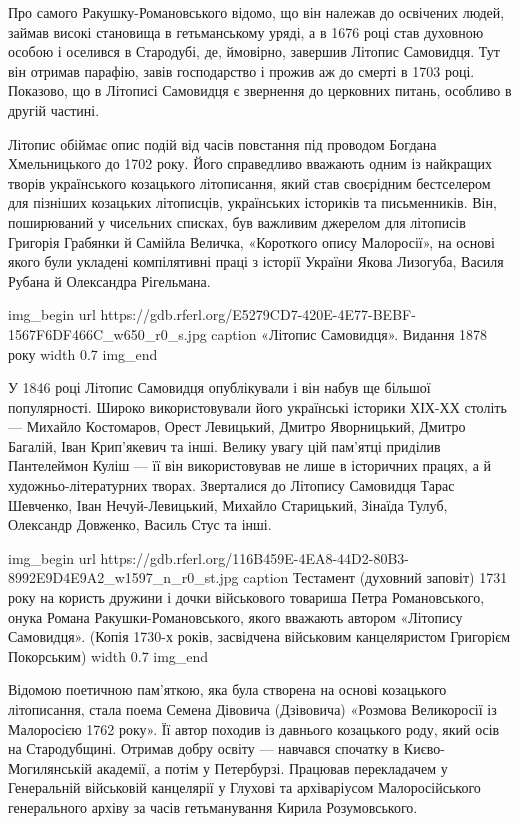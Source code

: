 Про самого Ракушку-Романовського відомо, що він належав до освічених людей,
займав високі становища в гетьманському уряді, а в 1676 році став духовною
особою і оселився в Стародубі, де, ймовірно, завершив Літопис Самовидця. Тут
він отримав парафію, завів господарство і прожив аж до смерті в 1703 році.
Показово, що в Літописі Самовидця є звернення до церковних питань, особливо в
другій частині.

Літопис обіймає опис подій від часів повстання під проводом Богдана
Хмельницького до 1702 року. Його справедливо вважають одним із найкращих творів
українського козацького літописання, який став своєрідним бестселером для
пізніших козацьких літописців, українських істориків та письменників. Він,
поширюваний у чисельних списках, був важливим джерелом для літописів Григорія
Грабянки й Самійла Величка, «Короткого опису Малоросії», на основі якого були
укладені компілятивні праці з історії України Якова Лизогуба, Василя Рубана й
Олександра Рігельмана.

\ifcmt
img_begin 
  url https://gdb.rferl.org/E5279CD7-420E-4E77-BEBF-1567F6DF466C_w650_r0_s.jpg
  caption «Літопис Самовидця». Видання 1878 року
  width 0.7
img_end
\fi

У 1846 році Літопис Самовидця опублікували і він набув ще більшої популярності.
Широко використовували його українські історики ХІХ-ХХ століть --- Михайло
Костомаров, Орест Левицький, Дмитро Яворницький, Дмитро Багалій, Іван
Крип’якевич та інші. Велику увагу цій пам’ятці приділив Пантелеймон Куліш --- її
він використовував не лише в історичних працях, а й художньо-літературних
творах. Зверталися до Літопису Самовидця Тарас Шевченко, Іван Нечуй-Левицький,
Михайло Старицький, Зінаїда Тулуб, Олександр Довженко, Василь Стус та інші.

\ifcmt
img_begin 
        url https://gdb.rferl.org/116B459E-4EA8-44D2-80B3-8992E9D4E9A2_w1597_n_r0_st.jpg
        caption Тестамент (духовний заповіт) 1731 року на користь дружини і
        дочки військового товариша Петра Романовського, онука Романа
        Ракушки-Романовського, якого вважають автором «Літопису Самовидця».
        (Копія 1730-х років, засвідчена військовим канцеляристом Григорієм
        Покорським)
        width 0.7
img_end
\fi

Відомою поетичною пам’яткою, яка була створена на основі козацького
літописання, стала поема Семена Дівовича (Дзівовича) «Розмова Великоросії із
Малоросією 1762 року». Її автор походив із давнього козацького роду, який осів
на Стародубщині. Отримав добру освіту --- навчався спочатку в Києво-Могилянській
академії, а потім у Петербурзі. Працював перекладачем у Генеральній військовій
канцелярії у Глухові та архіваріусом Малоросійського генерального архіву за
часів гетьманування Кирила Розумовського.

